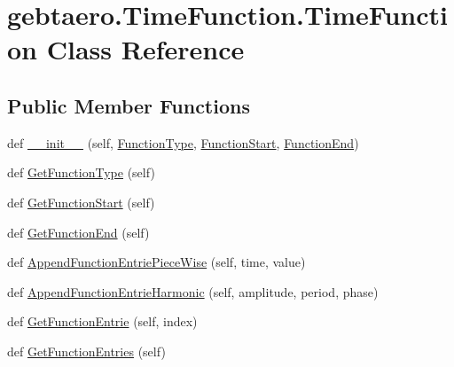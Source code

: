 \hypertarget{classgebtaero_1_1_time_function_1_1_time_function}{}\section{gebtaero.\+Time\+Function.\+Time\+Function Class Reference}
\label{classgebtaero_1_1_time_function_1_1_time_function}
\subsection*{Public Member Functions}
\begin{DoxyCompactItemize}
\item 
def \hyperlink{classgebtaero_1_1_time_function_1_1_time_function_a5f3a6ae6418be0f44d7a549af4a3f339}{\+\_\+\+\_\+init\+\_\+\+\_\+} (self, \hyperlink{classgebtaero_1_1_time_function_1_1_time_function_a71eb6968c49304736305aee5c1e37d51}{Function\+Type}, \hyperlink{classgebtaero_1_1_time_function_1_1_time_function_acd9020ddfc729ecc704fa0c246c2e903}{Function\+Start}, \hyperlink{classgebtaero_1_1_time_function_1_1_time_function_a21c1d719341196b82dd2def3400dd832}{Function\+End})
\item 
def \hyperlink{classgebtaero_1_1_time_function_1_1_time_function_a8dc2ddec757f586a51e250592b35c542}{Get\+Function\+Type} (self)
\item 
def \hyperlink{classgebtaero_1_1_time_function_1_1_time_function_a0ac4b6ccaaa06bb59697d195c213a23e}{Get\+Function\+Start} (self)
\item 
def \hyperlink{classgebtaero_1_1_time_function_1_1_time_function_afd4cbf5dab2375296785f178369bd16c}{Get\+Function\+End} (self)
\item 
def \hyperlink{classgebtaero_1_1_time_function_1_1_time_function_afa29c862ffe8297dbbea0aabaf8f5a08}{Append\+Function\+Entrie\+Piece\+Wise} (self, time, value)
\item 
def \hyperlink{classgebtaero_1_1_time_function_1_1_time_function_a8e4d81106458219357606a349486c2e6}{Append\+Function\+Entrie\+Harmonic} (self, amplitude, period, phase)
\item 
def \hyperlink{classgebtaero_1_1_time_function_1_1_time_function_ad72311bf84c87fe3af022735cdba6b6e}{Get\+Function\+Entrie} (self, index)
\item 
def \hyperlink{classgebtaero_1_1_time_function_1_1_time_function_aa37de4ed1aaf0c0f753582c3baee08fe}{Get\+Function\+Entries} (self)
\end{DoxyCompactItemize}
